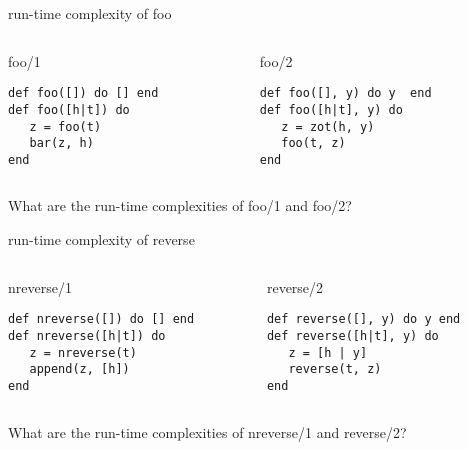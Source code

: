\begin{frame}[fragile]{run-time complexity of foo}


\pause\vspace{20pt}
\begin{columns}
   \begin{column}{.5\linewidth}
     \begin{block}{foo/1}
       \begin{verbatim}
def foo([]) do [] end
def foo([h|t]) do
   z = foo(t)
   bar(z, h)
end
       \end{verbatim}
      \end{block}
    \end{column}
\pause
    \begin{column}{.5\linewidth}
     \begin{block}{foo/2}
       \begin{verbatim}
def foo([], y) do y  end
def foo([h|t], y) do
   z = zot(h, y)
   foo(t, z)
end
       \end{verbatim}
      \end{block}
    \end{column}
  \end{columns}

\pause\vspace{20pt}
What are the run-time complexities of foo/1 and foo/2?

\end{frame}


\begin{frame}[fragile]{run-time complexity of reverse}

\pause\vspace{20pt}
\begin{columns}
   \begin{column}{.5\linewidth}
     \begin{block}{nreverse/1}
       \begin{verbatim}
def nreverse([]) do [] end
def nreverse([h|t]) do 
   z = nreverse(t)
   append(z, [h])
end
       \end{verbatim}
      \end{block}
    \end{column}
\pause
    \begin{column}{.5\linewidth}
     \begin{block}{reverse/2}
       \begin{verbatim}
def reverse([], y) do y end
def reverse([h|t], y) do 
   z = [h | y]
   reverse(t, z)
end
       \end{verbatim}
      \end{block}
    \end{column}
  \end{columns}

\pause\vspace{20pt}
What are the run-time complexities of nreverse/1 and reverse/2?

\end{frame}

